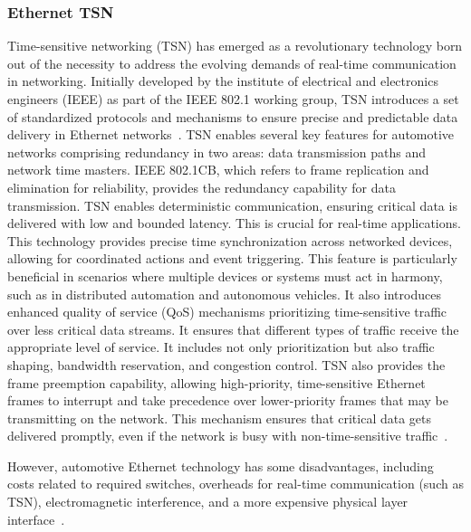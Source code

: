     
    \subsubsection{Ethernet TSN}
    Time-sensitive networking (TSN) has emerged as a revolutionary technology born out of the necessity to address the evolving demands of real-time communication in networking. Initially developed by the institute of electrical and electronics engineers (IEEE) as part of the IEEE 802.1 working group, TSN introduces a set of standardized protocols and mechanisms to ensure precise and predictable data delivery in Ethernet networks~\cite{finn2018introduction, TSN}. TSN enables several key features for automotive networks comprising redundancy in two areas: data transmission paths and network time masters. IEEE 802.1CB, which refers to frame replication and elimination for reliability, provides the redundancy capability for data transmission. TSN enables deterministic communication, ensuring critical data is delivered with low and bounded latency. This is crucial for real-time applications. This technology provides precise time synchronization across networked devices, allowing for coordinated actions and event triggering. This feature is particularly beneficial in scenarios where multiple devices or systems must act in harmony, such as in distributed automation and autonomous vehicles. It also introduces enhanced quality of service (QoS) mechanisms prioritizing time-sensitive traffic over less critical data streams. It ensures that different types of traffic receive the appropriate level of service. It includes not only prioritization but also traffic shaping, bandwidth reservation, and congestion control.
     TSN also provides the frame preemption capability, allowing high-priority, time-sensitive Ethernet frames to interrupt and take precedence over lower-priority frames that may be transmitting on the network. This mechanism ensures that critical data gets delivered promptly, even if the network is busy with non-time-sensitive traffic~\cite{finn2018introduction,TSN, 9613692}.
    
    
    
    However, automotive Ethernet technology has some disadvantages, including costs related to required switches, overheads for real-time communication (such as TSN), electromagnetic interference, and a more expensive physical layer interface~\cite{AutomotiveEt}.       
    
